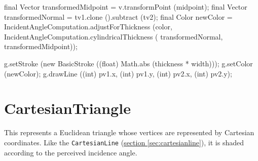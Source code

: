 \documentclass{report}
\newcommand{\Ref}[2]{\hyperref[#2]{#1 \ref*{#2}}}
\begin{document}
\begin{javacode}
{{{      final Vector transformedMidpoint = v.transformPoint (midpoint);
      final Vector transformedNormal   = tv1.clone ().subtract (tv2);
      final Color  newColor            = IncidentAngleComputation.adjustForThickness (color,
                                          IncidentAngleComputation.cylindricalThickness (
                                            transformedNormal, transformedMidpoint));

      g.setStroke (new BasicStroke ((float) Math.abs (thickness * width)));
      g.setColor  (newColor);
      g.drawLine  ((int) pv1.x, (int) pv1.y, (int) pv2.x, (int) pv2.y);
    }
  }
}
\end{javacode}

\section {CartesianTriangle} \label{sec:cartesiantriangle}
      This represents a Euclidean triangle whose vertices are represented by Cartesian coordinates. Like the {\tt CartesianLine}
      (\Ref{section}{sec:cartesianline}), it is shaded according to the perceived incidence angle.
\end{document}
